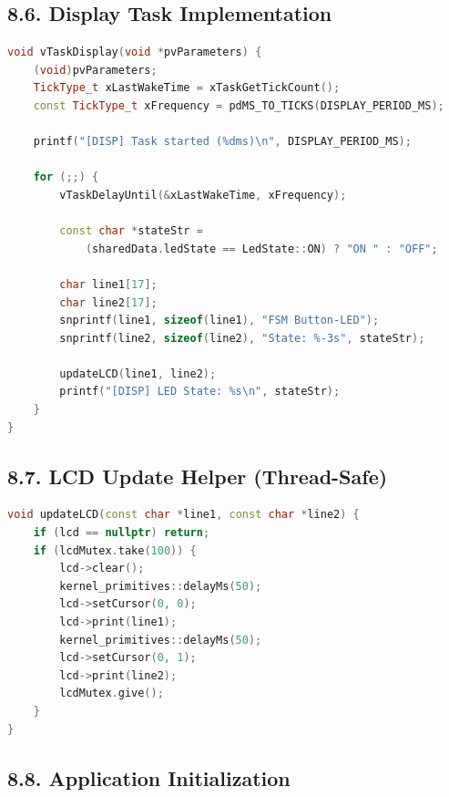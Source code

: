 \documentclass[12pt]{article}
\begin{document}
\subsection*{8.6. Display Task Implementation}

\begin{lstlisting}[language=C++, caption=Display Task (tasks.cpp)]
void vTaskDisplay(void *pvParameters) {
    (void)pvParameters;
    TickType_t xLastWakeTime = xTaskGetTickCount();
    const TickType_t xFrequency = pdMS_TO_TICKS(DISPLAY_PERIOD_MS);

    printf("[DISP] Task started (%dms)\n", DISPLAY_PERIOD_MS);

    for (;;) {
        vTaskDelayUntil(&xLastWakeTime, xFrequency);

        const char *stateStr =
            (sharedData.ledState == LedState::ON) ? "ON " : "OFF";

        char line1[17];
        char line2[17];
        snprintf(line1, sizeof(line1), "FSM Button-LED");
        snprintf(line2, sizeof(line2), "State: %-3s", stateStr);

        updateLCD(line1, line2);
        printf("[DISP] LED State: %s\n", stateStr);
    }
}
\end{lstlisting}

\subsection*{8.7. LCD Update Helper (Thread-Safe)}

\begin{lstlisting}[language=C++, caption=updateLCD helper (sync.cpp)]
void updateLCD(const char *line1, const char *line2) {
    if (lcd == nullptr) return;
    if (lcdMutex.take(100)) {
        lcd->clear();
        kernel_primitives::delayMs(50);
        lcd->setCursor(0, 0);
        lcd->print(line1);
        kernel_primitives::delayMs(50);
        lcd->setCursor(0, 1);
        lcd->print(line2);
        lcdMutex.give();
    }
}
\end{lstlisting}

\subsection*{8.8. Application Initialization}
\end{document}
